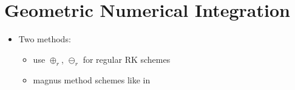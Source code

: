 
\chapter{Geometric Numerical Integration}

\begin{itemize}
  \item Two methods:
    \begin{itemize}
      \item use $\oplus_r$, $\ominus_r$ for regular RK schemes
      \item magnus method schemes like in \cite{blanes_concise_2016}
    \end{itemize}
\end{itemize}

